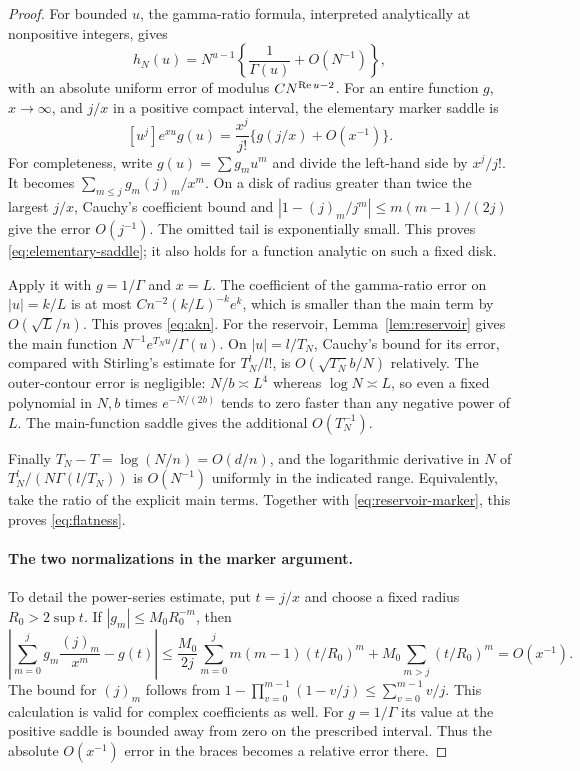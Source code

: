 \documentclass[11pt]{article}
\theoremstyle{definition}\newtheorem{definition}[theorem]{Definition}
\theoremstyle{remark}\newtheorem{remark}[theorem]{Remark}
\numberwithin{equation}{section}\allowdisplaybreaks
\begin{document}
\begin{proof}
For bounded $u$, the gamma-ratio formula, interpreted analytically at
nonpositive integers, gives
\[
 h_N(u)=N^{u-1}\left\{\frac1{\Gamma(u)}+O(N^{-1})\right\},
\]
with an absolute uniform error of modulus $CN^{\operatorname{Re} u-2}$.
For an entire function $g$, $x\to\infty$, and $j/x$ in a positive
compact interval, the elementary marker saddle is
\begin{equation}\label{eq:elementary-saddle}
 [u^j]e^{xu}g(u)=\frac{x^j}{j!}\{g(j/x)+O(x^{-1})\}.
\end{equation}
For completeness, write $g(u)=\sum g_m u^m$ and divide the left-hand
side by $x^j/j!$. It becomes
$\sum_{m\le j}g_m(j)_m/x^m$. On a disk of radius greater than twice the
largest $j/x$, Cauchy's coefficient bound and
$|1-(j)_m/j^m|\le m(m-1)/(2j)$ give the error $O(j^{-1})$.
The omitted tail is exponentially small. This proves
\eqref{eq:elementary-saddle}; it also holds for a function analytic on
such a fixed disk.

Apply it with $g=1/\Gamma$ and $x=L$. The coefficient of the gamma-ratio
error on $|u|=k/L$ is at most
$Cn^{-2}(k/L)^{-k}e^k$, which is smaller than the main term by
$O(\sqrt L/n)$. This proves \eqref{eq:akn}.
For the reservoir, Lemma~\ref{lem:reservoir} gives the main function
$N^{-1}e^{T_Nu}/\Gamma(u)$. On $|u|=l/T_N$, Cauchy's bound for its error,
compared with Stirling's estimate for $T_N^l/l!$, is
$O(\sqrt{T_N}b/N)$ relatively. The outer-contour error is negligible:
$N/b\asymp L^4$ whereas $\log N\asymp L$, so even a fixed polynomial
in $N,b$ times $e^{-N/(2b)}$ tends to zero faster than any negative
power of $L$. The main-function saddle gives the additional $O(T_N^{-1})$.

Finally $T_N-T=\log(N/n)=O(d/n)$, and the logarithmic derivative in $N$
of $T_N^l/(N\Gamma(l/T_N))$ is $O(N^{-1})$ uniformly in the indicated
range. Equivalently, take the ratio of the explicit main terms.
Together with \eqref{eq:reservoir-marker}, this proves \eqref{eq:flatness}.

\paragraph{The two normalizations in the marker argument.}
To detail the power-series estimate, put $t=j/x$ and choose a fixed
radius $R_0>2\sup t$. If $|g_m|\le M_0R_0^{-m}$, then
\[
 \left|\sum_{m=0}^j g_m\frac{(j)_m}{x^m}-g(t)\right|
 \le \frac{M_0}{2j}\sum_{m=0}^j m(m-1)(t/R_0)^m
       +M_0\sum_{m>j}(t/R_0)^m
 =O(x^{-1}).
\]
The bound for $(j)_m$ follows from
$1-\prod_{v=0}^{m-1}(1-v/j)\le\sum_{v=0}^{m-1}v/j$.
This calculation is valid for complex coefficients as well. For
$g=1/\Gamma$ its value at the positive saddle is bounded away from
zero on the prescribed interval. Thus the absolute $O(x^{-1})$
error in the braces becomes a relative error there.


\end{proof}
\end{document}
